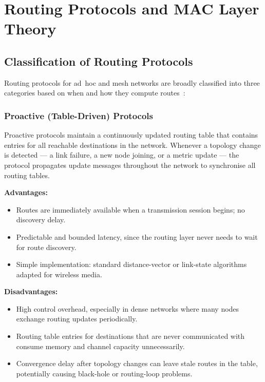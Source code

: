 \chapter{Routing Protocols and MAC Layer Theory}
\label{ch:routing}

\section{Classification of Routing Protocols}

Routing protocols for ad~hoc and mesh networks are broadly classified into three
categories based on when and how they compute routes~\cite{abolhasan2004review}:

\subsection{Proactive (Table-Driven) Protocols}

Proactive protocols maintain a continuously updated routing table that contains entries
for all reachable destinations in the network. Whenever a topology change is detected
--- a link failure, a new node joining, or a metric update --- the protocol propagates
update messages throughout the network to synchronise all routing tables.

\textbf{Advantages:}
\begin{itemize}
  \item Routes are immediately available when a transmission session begins; no discovery delay.
  \item Predictable and bounded latency, since the routing layer never needs to wait for route discovery.
  \item Simple implementation: standard distance-vector or link-state algorithms adapted for wireless media.
\end{itemize}

\textbf{Disadvantages:}
\begin{itemize}
  \item High control overhead, especially in dense networks where many nodes exchange routing updates periodically.
  \item Routing table entries for destinations that are never communicated with consume memory and channel capacity unnecessarily.
  \item Convergence delay after topology changes can leave stale routes in the table, potentially causing black-hole or routing-loop problems.
\end{itemize}

